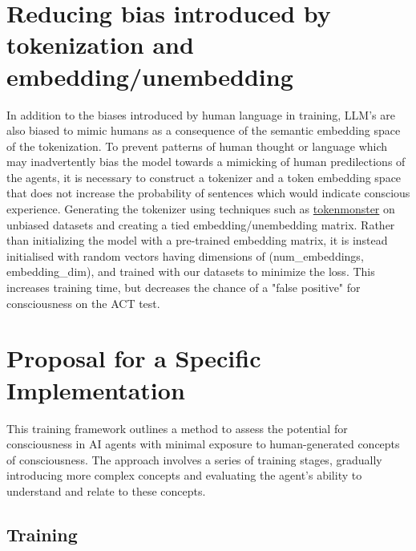 \documentclass{article}
\begin{document}
\section{Reducing bias introduced by tokenization and embedding/unembedding}

In addition to the biases introduced by human language in training, LLM's are also biased to mimic humans as a consequence of the semantic embedding space of the tokenization. To prevent patterns of human thought or language which may inadvertently bias the model towards a mimicking of human predilections of the  agents, it is necessary to construct a tokenizer and a token embedding space that does not increase the probability of sentences which would indicate conscious experience. Generating the tokenizer using techniques such as \href{https://github.com/alasdairforsythe/tokenmonster}{tokenmonster} on unbiased datasets and creating a tied embedding/unembedding matrix. Rather than initializing the model with a pre-trained embedding matrix, it is instead initialised with random vectors having dimensions of (num\_embeddings, embedding\_dim), and trained with our datasets to minimize the loss. This increases training time, but decreases the chance of a "false positive" for consciousness on the ACT test. 


\section{Proposal for a Specific Implementation}

This training framework outlines a method to assess the potential for consciousness in AI agents with minimal exposure to human-generated concepts of consciousness. The approach involves a series of training stages, gradually introducing more complex concepts and evaluating the agent's ability to understand and relate to these concepts. 

\subsection{Training}
\end{document}
